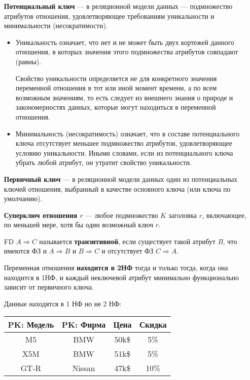 \textbf{Потенциальный ключ} --- в реляционной модели данных --- подмножество атрибутов отношения, удовлетворяющее требованиям уникальности и минимальности (несократимости).
\begin{itemize}
    \item Уникальность означает, что нет и не может быть двух кортежей данного отношения, в которых значения этого подмножества атрибутов совпадают (равны).
    
    Свойство уникальности определяется не для конкретного значения переменной отношения в тот или иной момент времени, а по всем возможным значениям, то есть следует из внешнего знания о природе и закономерностях данных, которые могут находиться в переменной отношения.
    \item Минимальность (несократимость) означает, что в составе потенциального ключа отсутствует меньшее подмножество атрибутов, удовлетворяющее условию уникальности.
    Иными словами, если из потенциального ключа убрать любой атрибут, он утратит свойство уникальности.
\end{itemize}

\textbf{Первичный ключ} --- в реляционной модели данных один из потенциальных ключей отношения, выбранный в качестве основного ключа (или ключа по умолчанию).

\textbf{Суперключ отношения $r$} --- любое подмножество $K$ заголовка $r$, включающее, по меньшей мере, хотя бы один возможный ключ $r$.

FD $A \Rightarrow C$ называется \textbf{транзитивной}, если существует такой атрибут $B$, что имеются ФЗ и $A \Rightarrow B$ и $B \Rightarrow C$ и отсутствует ФЗ $C \Rightarrow A$.

Переменная отношения \textbf{находится в 2НФ} тогда и только тогда, когда она находится в 1НФ, и каждый неключевой атрибут минимально функционально зависит от первичного ключа.

Данные находятся в 1 НФ но не 2 НФ:

\begin{tabular}{|c|c|c|c|}
    \hline
    \textbf{PK: Модель} & \textbf{PK: Фирма} & Цена & Скидка \\
    \hline
    \hline
    M5  & BMW     & 50k\$ & 5\% \\
    \hline
    X5M & BMW     & 51k\$ & 5\% \\
    \hline
    GT-R & Nissan & 47k\$ & 10\% \\
    \hline
\end{tabular}


